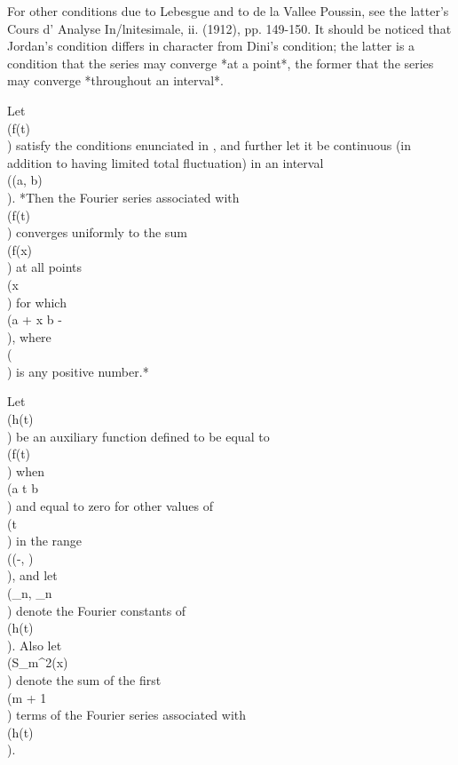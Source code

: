For other conditions due to Lebesgue and to
de la Vallee Poussin, %
see the latter's
Cours d' Analyse In/lnitesimale, ii. (1912), pp. 149-150. %
It should be noticed that Jordan's condition differs in character from
Dini's condition; the latter is a condition that the series may
converge *at a point*, the former that the series may converge
*throughout an interval*.

Let \\(f(t)\\) satisfy the conditions enunciated in ,
and further let it be continuous
(in addition to having limited total fluctuation) in
an interval \\((a, b)\\). *Then the Fourier series associated with \\(f(t)\\)
  converges uniformly to the sum \\(f(x)\\) at all points \\(x\\) for which
  \\(a + \delta \leq x \leq b - \delta\\), where \\(\delta\\) is any positive number.*

Let \\(h(t)\\) be an auxiliary function defined to be equal to \\(f(t)\\) when
\\(a \leq t \leq b\\) and equal to zero for other values of \\(t\\) in the range
\\((-\pi, \pi)\\), and
let \\(\alpha_{n}, \beta_{n}\\) denote the Fourier constants of \\(h(t)\\).
Also let \\(S_{m}^{2}(x)\\) denote the sum of the first \\(m + 1\\) terms of the
Fourier series associated with \\(h(t)\\).

